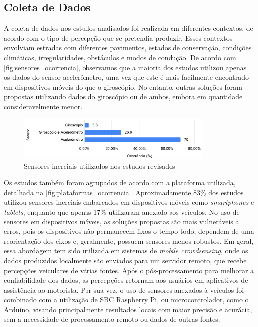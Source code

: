 \subsection{Coleta de Dados}

A coleta de dados nos estudos analisados foi realizada em diferentes contextos, de acordo com o tipo de percepção que se pretendia produzir. Esses contextos envolviam estradas com diferentes pavimentos, estados de conservação, condições climáticas, irregularidades, obstáculos e modos de condução. De acordo com \autoref{fig:sensores_ocorrencia}, observamos que a maioria dos estudos utilizou apenas os dados do sensor acelerômetro, uma vez que este é mais facilmente encontrado em dispositivos móveis do que o giroscópio. No entanto, outras soluções foram propostas utilizando dados do giroscópio ou de ambos, embora em quantidade consideravelmente menor.

\begin{figure}[h!]
  \centering
  \caption{Sensores inerciais utilizados nos estudos revisados}
   \label{fig:sensores_ocorrencia}
   \includegraphics[width=0.85\textwidth]{figuras/fig_14.png}
\end{figure}

Os estudos também foram agrupados de acordo com a plataforma utilizada, detalhada na \autoref{fig:plataformas_ocorrencia}. Aproximadamente 83\% dos estudos utilizou sensores inerciais embarcados em dispositivos móveis como \textit{smartphones} e \textit{tablets}, enquanto que apenas 17\% utilizaram anexado aos veículos. No uso de sensores em dispositivos móveis, as soluções propostas são mais vulneráveis a erros, pois os dispositivos não permanecem fixos o tempo todo, dependem de uma reorientação dos eixos e, geralmente, possuem sensores menos robustos. Em geral, essa abordagem tem sido utilizada em sistemas de \textit{mobile crowdsensing}, onde os dados produzidos localmente são enviados para um servidor remoto, que recebe percepções veiculares de várias fontes. Após o pós-processamento para melhorar a confiabilidade dos dados, as percepções retornam aos usuários em aplicativos de assistência ao motorista. Por sua vez, o uso de sensores anexados à veículos foi combinado com a utilização de SBC Raspberry Pi, ou microcontrolador, como o Arduíno, visando principalmente resultados locais com maior precisão e acurácia, sem a necessidade de processamento remoto ou dados de outras fontes.

